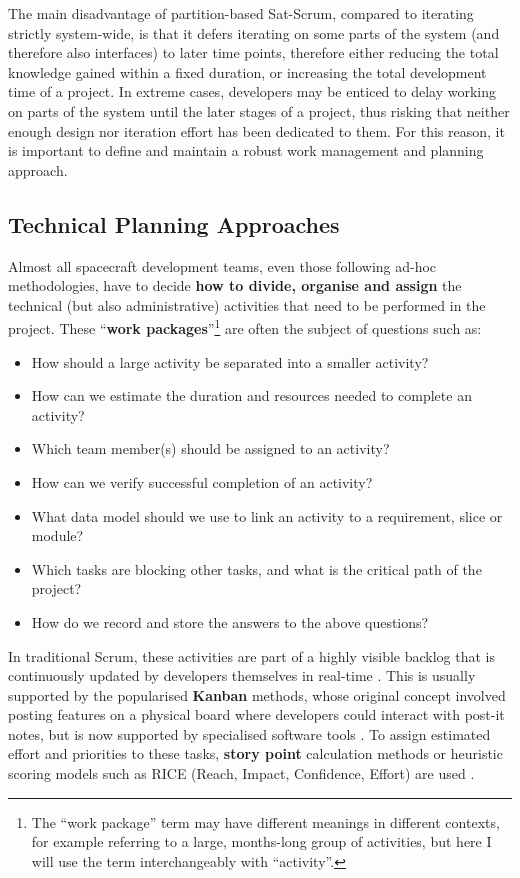 \documentclass[a4paper,nobib,justified,final]{tufte-book}
\begin{document}
The main disadvantage of partition-based Sat-Scrum, compared to iterating strictly system-wide, is that it defers iterating on some parts of the system (and therefore also interfaces) to  later time points, therefore either reducing the total knowledge gained within a fixed duration, or increasing the total development time of a project.
In extreme cases, developers may be enticed to delay working on parts of the system until the later stages of a project, thus risking that neither enough design nor iteration effort has been dedicated to them. For this reason, it is important to define and maintain a robust work management and planning approach.
\FloatBarrier
\subsection{Technical Planning Approaches}
\label{sec:METHODOLOGY_workpackage}

Almost all spacecraft development teams, even those following ad-hoc methodologies, have to decide \textbf{how to divide, organise and assign} the technical (but also administrative) activities that need to be performed in the project. These ``\textbf{work packages}''\footnote{The ``work package'' term may have different meanings in different contexts, for example referring to a large, months-long group of activities, but here I will use the term interchangeably with ``activity''.} are often the subject of questions such as:\begin{itemize}[itemsep=-2ex]
	\item How should a large activity be separated into a smaller activity?
	\item How can we estimate the duration and resources needed to complete an activity?
	\item Which team member(s) should be assigned to an activity?
	\item How can we verify successful completion of an activity?
	\item What data model should we use to link an activity to a requirement, slice or module?
	\item Which tasks are blocking other tasks, and what is the critical path of the project?
	\item How do we record and store the answers to the above questions?
\end{itemize}

In traditional Scrum, these activities are part of a highly visible backlog that is continuously updated by developers themselves in real-time \autocite{schwaverDefinitiveGuideScrum2020}. This is usually supported by the popularised \textbf{Kanban} methods, whose original concept involved posting features on a physical board where developers could interact with post-it notes, but is now supported by specialised software tools \autocite{kanbanGuide}. To assign estimated effort and priorities to these tasks, \textbf{story point} calculation methods or heuristic scoring models such as RICE (Reach, Impact, Confidence, Effort) are used \autocite{mcbrideRICESimplePrioritization2018}.
\end{document}
